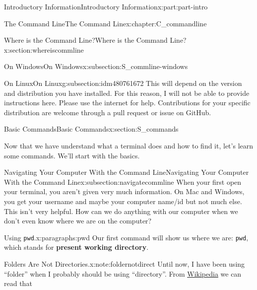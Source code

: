 \documentclass[oneside,10pt,]{book}
\newcommand{\mono}[1]{\texttt{#1}}
\newcommand{\terminology}[1]{\textbf{#1}}
\begin{document}
\begin{partptx}{Introductory Information}{}{Introductory Information}{}{}{x:part:part-intro}
\begin{chapterptx}{The Command Line}{}{The Command Line}{}{}{x:chapter:C_commandline}
\begin{sectionptx}{Where is the Command Line?}{}{Where is the Command Line?}{}{}{x:section:whereiscommline}
\begin{subsectionptx}{On Windows}{}{On Windows}{}{}{x:subsection:S_commline-windows}
\end{subsectionptx}
%
%
\typeout{************************************************}
\typeout{************************************************}
%
\begin{subsectionptx}{On Linux}{}{On Linux}{}{}{g:subsection:idm480761672}
%
This will depend on the version and distribution you have installed. For this reason, I will not be able to provide instructions here. Please use the internet for help. Contributions for your specific distribution are welcome through a pull request or issue on GitHub.%
\end{subsectionptx}
\end{sectionptx}
%
%
\typeout{************************************************}
\typeout{************************************************}
%
\begin{sectionptx}{Basic Commands}{}{Basic Commands}{}{}{x:section:S_commands}
%
%
%
\begin{introduction}{}%
Now that we have understand what a terminal does and how to find it, let's learn some commands. We'll start with the basics.%
\end{introduction}%
%
%
\typeout{************************************************}
\typeout{************************************************}
%
\begin{subsectionptx}{Navigating Your Computer With the Command Line}{}{Navigating Your Computer With the Command Line}{}{}{x:subsection:navigatecommline}
%
When your first open your terminal, you aren't given very much information. On Mac and Windows, you get your username and maybe your computer name\slash{}id but not much else. This isn't very helpful. How can we do anything with our computer when we don't even know where we are on the computer?%
\begin{paragraphs}{Using \mono{pwd}.}{x:paragraphs:pwd}%
\index{command line!\mono{pwd}}%
%
\index{\mono{pwd}}%
Our first command will show us where we are: \mono{pwd}, which stands for \terminology{present working directory}. \begin{note}{Folders Are Not Directories.}{x:note:foldernotdirect}%
Until now, I have been using ``folder'' when I probably should be using ``directory''. From \href{https://en.wikipedia.org/wiki/Directory_\%28computing\%29\#Folder_metaphor}{Wikipedia}\footnotemark{} we can read that \begin{quote}%

\end{quote}
\end{note}
\end{paragraphs}
\end{subsectionptx}
\end{sectionptx}
\end{chapterptx}
\end{partptx}
\end{document}
